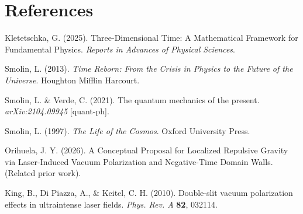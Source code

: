 \documentclass[11pt,a4paper]{article}
\begin{document}
\section*{References}
\begin{enumerate}[leftmargin=*,label={[\arabic*]}]
    \item Kletetschka, G. (2025). Three-Dimensional Time: A Mathematical Framework for Fundamental Physics. \textit{Reports in Advances of Physical Sciences}.
    \item Smolin, L. (2013). \textit{Time Reborn: From the Crisis in Physics to the Future of the Universe}. Houghton Mifflin Harcourt.
    \item Smolin, L. \& Verde, C. (2021). The quantum mechanics of the present. \textit{arXiv:2104.09945} [quant-ph].
    \item Smolin, L. (1997). \textit{The Life of the Cosmos}. Oxford University Press.
    \item Orihuela, J. Y. (2026). A Conceptual Proposal for Localized Repulsive Gravity via Laser-Induced Vacuum Polarization and Negative-Time Domain Walls. (Related prior work).
    \item King, B., Di Piazza, A., \& Keitel, C. H. (2010). Double-slit vacuum polarization effects in ultraintense laser fields. \textit{Phys. Rev. A} \textbf{82}, 032114.
\end{enumerate}
\end{document}
